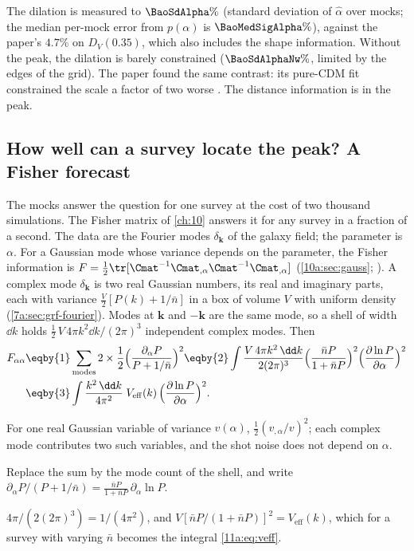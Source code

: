 The dilation is measured to $\BaoSdAlpha\%$ (standard deviation of $\hat\alpha$ over
mocks; the median per-mock error from $p(\alpha)$ is $\BaoMedSigAlpha\%$),
against the paper's $4.7\%$ on $D_V(0.35)$, which also includes the shape
information. Without the peak, the dilation is barely constrained
($\BaoSdAlphaNw\%$, limited by the edges of the grid). The paper found the same
contrast: its pure-CDM fit constrained the scale a factor of two worse
. The distance information is in the peak.

\subsection{How well can a survey locate the peak? A Fisher forecast}
\label{11a:sec:bao-fisher}

The mocks answer the question for one survey at the cost of two thousand
simulations. The Fisher matrix of \cref{ch:10} answers it for any survey in a
fraction of a second. The data are the Fourier modes $\delta_{\bm k}$ of the galaxy
field; the parameter is $\alpha$. For a Gaussian mode whose variance depends on the
parameter, the Fisher information is
$F=\frac12\tr[\Cmat^{-1}\Cmat_{,\alpha}\Cmat^{-1}\Cmat_{,\alpha}]$
(\cref{10a:sec:gauss}; ). A complex mode
$\delta_{\bm k}$ is two real Gaussian numbers, its real and imaginary parts, each
with variance $\frac V2[P(k)+1/\bar n]$ in a box of volume $V$ with uniform
density (\cref{7a:sec:grf-fourier}). Modes at $\bm k$ and $-\bm k$ are the same
mode, so a shell of width $\dd k$ holds $\frac12\,V\,4\pi k^2\dd k/(2\pi)^3$
independent complex modes. Then
\begin{align}
  F_{\alpha\alpha}
  &\eqby{1}\sum_{\text{modes}}2\times\frac12
     \Bigl(\frac{\partial_\alpha P}{P+1/\bar n}\Bigr)^2
   \eqby{2}\int\frac{V\,4\pi k^2\,\dd k}{2(2\pi)^3}
     \Bigl(\frac{\bar nP}{1+\bar nP}\Bigr)^2
     \Bigl(\frac{\partial\ln P}{\partial\alpha}\Bigr)^2\nonumber\\
  &\eqby{3}\int\frac{k^2\,\dd k}{4\pi^2}\;V_{\mathrm{eff}}(k)\,
     \Bigl(\frac{\partial\ln P}{\partial\alpha}\Bigr)^2 .
  \label{11a:eq:fisher-alpha}
\end{align}
\begin{explain}
  \item For one real Gaussian variable of variance $v(\alpha)$,
        $\frac12(v_{,\alpha}/v)^2$; each complex mode contributes two such
        variables, and the shot noise does not depend on $\alpha$.
  \item Replace the sum by the mode count of the shell, and write
        $\partial_\alpha P/(P+1/\bar n)=\frac{\bar nP}{1+\bar nP}\,\partial_\alpha\ln P$.
  \item $4\pi/(2(2\pi)^3)=1/(4\pi^2)$, and
        $V[\bar nP/(1+\bar nP)]^2=V_{\mathrm{eff}}(k)$, which for a survey with
        varying $\bar n$ becomes the integral \eqref{11a:eq:veff}.
\end{explain}
